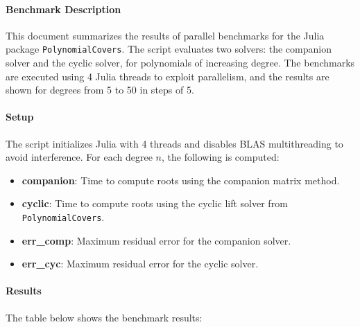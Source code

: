 \documentclass{article}
\begin{document}

\paragraph{Benchmark Description}
This document summarizes the results of parallel benchmarks for the Julia package \texttt{PolynomialCovers}. The script evaluates two solvers: the companion solver and the cyclic solver, for polynomials of increasing degree. The benchmarks are executed using 4 Julia threads to exploit parallelism, and the results are shown for degrees from 5 to 50 in steps of 5.

\paragraph{Setup}
The script initializes Julia with 4 threads and disables BLAS multithreading to avoid interference. For each degree $n$, the following is computed:
\begin{itemize}
  \item \textbf{companion}: Time to compute roots using the companion matrix method.
  \item \textbf{cyclic}: Time to compute roots using the cyclic lift solver from \texttt{PolynomialCovers}.
  \item \textbf{err\_comp}: Maximum residual error for the companion solver.
  \item \textbf{err\_cyc}: Maximum residual error for the cyclic solver.
\end{itemize}

\paragraph{Results}
The table below shows the benchmark results:
\end{document}
